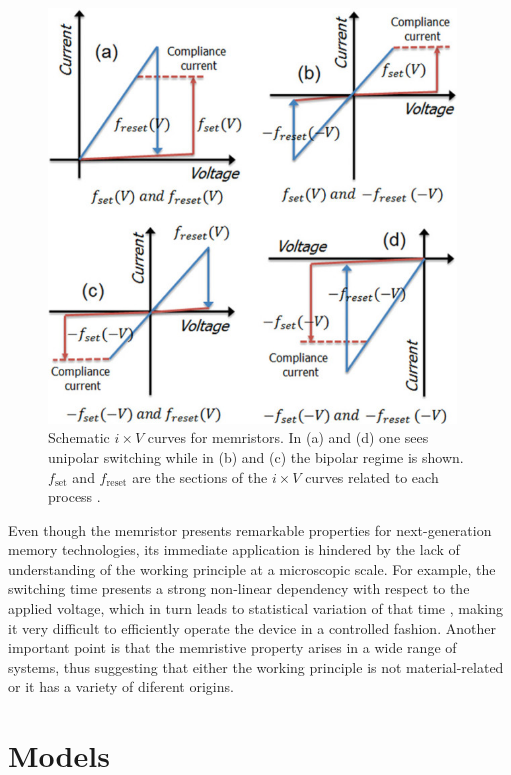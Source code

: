 \begin{center}
  \begin{figure}[h!]
    \begin{center}
      \includegraphics[height=11cm]{img/Jeong2012RepProgPhys.jpg}
      \caption{Schematic $i \times V$ curves for memristors. In (a) and (d) one sees unipolar switching while in (b) and (c) the bipolar regime is shown. $f_{\text{set}}$ and $f_{\text{reset}}$ are the sections of the $i \times V$ curves related to each process \cite{Jeong2012}.}
      \label{fig:unipolar-bipolar} 
    \end{center}
  \end{figure}
\end{center}

Even though the memristor presents remarkable properties for next-generation memory technologies, its immediate application is hindered by the lack of understanding of the working principle at a microscopic scale. For example, the switching time presents a strong non-linear dependency with respect to the applied voltage, which in turn leads to statistical variation of that time \cite{Medeiros-Ribeiro2011,Pickett2009}, making it very difficult to efficiently operate the device in a controlled fashion. Another important point is that the memristive property arises in a wide range of systems, thus suggesting that either the working principle is not material-related or it has a variety of diferent origins.
\newpage

\section{Models}
\label{sec:models}

